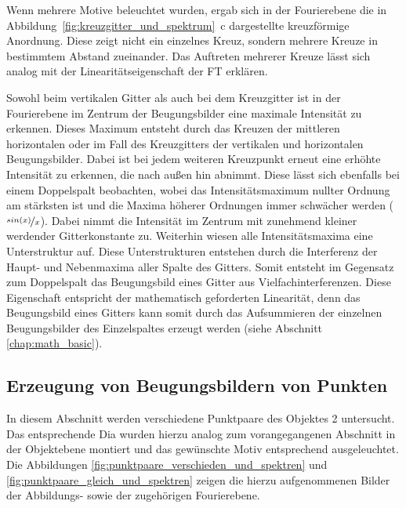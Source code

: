 Wenn mehrere Motive beleuchtet wurden, ergab sich in der Fourierebene die in Abbildung~\ref{fig:kreuzgitter_und_spektrum}~c dargestellte kreuzförmige Anordnung. Diese zeigt nicht ein einzelnes Kreuz, sondern mehrere Kreuze in bestimmtem Abstand zueinander. Das Auftreten mehrerer Kreuze lässt sich analog mit der Linearitätseigenschaft der FT erklären.

Sowohl beim vertikalen Gitter als auch bei dem Kreuzgitter ist in der Fourierebene im Zentrum der Beugungsbilder eine maximale Intensität zu erkennen. Dieses Maximum entsteht durch das Kreuzen der mittleren horizontalen oder im Fall des Kreuzgitters der vertikalen und horizontalen Beugungsbilder. Dabei ist bei jedem weiteren Kreuzpunkt erneut eine erhöhte Intensität zu erkennen, die nach außen hin abnimmt. Diese lässt sich ebenfalls bei einem
Doppelspalt beobachten, wobei das Intensitätsmaximum nullter Ordnung am stärksten ist und die Maxima höherer Ordnungen immer schwächer werden ($\nicefrac{sin(x)}{x}$). Dabei nimmt die Intensität im Zentrum mit zunehmend kleiner werdender Gitterkonstante zu.
Weiterhin wiesen alle Intensitätsmaxima eine Unterstruktur auf. Diese Unterstrukturen entstehen durch die Interferenz der Haupt- und Nebenmaxima aller Spalte des Gitters. Somit entsteht im Gegensatz zum Doppelspalt das Beugungsbild eines Gitter aus Vielfachinterferenzen. Diese Eigenschaft entspricht der mathematisch geforderten Linearität, denn das Beugungsbild eines Gitters kann somit durch das Aufsummieren der einzelnen Beugungsbilder des Einzelspaltes erzeugt werden (siehe Abschnitt \ref{chap:math_basic}).


\subsection{Erzeugung von Beugungsbildern von Punkten}

In diesem Abschnitt werden verschiedene Punktpaare des Objektes 2 untersucht. Das entsprechende Dia wurden hierzu analog zum vorangegangenen Abschnitt in der Objektebene montiert und das gewünschte Motiv entsprechend ausgeleuchtet. Die Abbildungen \ref{fig:punktpaare_verschieden_und_spektren} und \ref{fig:punktpaare_gleich_und_spektren} zeigen die hierzu aufgenommenen Bilder der Abbildungs- sowie der zugehörigen Fourierebene. 

